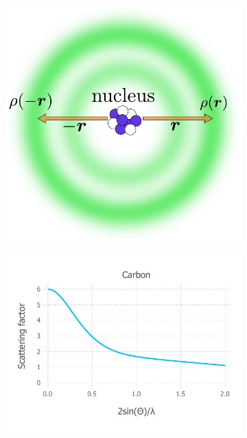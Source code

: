             \begin{figure}
                \centering
                \begin{subfigure}[b]{0.4\textwidth}
                        \centering
                        \includegraphics[width=\textwidth]{figures/introduction/atomicelectroncloud.pdf}
                        \caption{}
                        \label{fig:atomic electron cloud}
                \end{subfigure}
                \qquad
                \begin{subfigure}[b]{0.5\textwidth}
                        \centering
                        \includegraphics[width=\textwidth]{figures/introduction/carbonscatfac.pdf}

\end{subfigure}
\end{figure}
